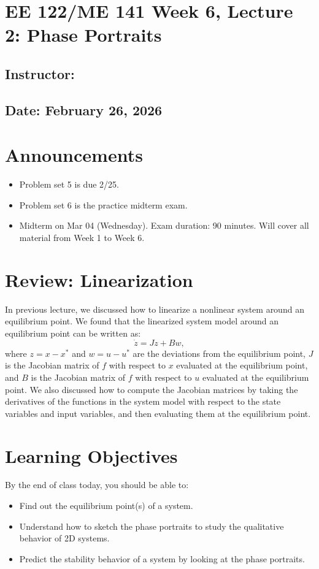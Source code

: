 \documentclass{ee122_notes}
\renewcommand{\releasedate}{February 26, 2026}
\begin{document}
\section*{EE 122/ME 141 Week 6, Lecture 2: Phase Portraits}
\subsection*{Instructor: \instructor}
\subsection*{Date: \releasedate}
\section{Announcements}
\begin{itemize}
    \item Problem set 5 is due 2/25.
    \item Problem set 6 is the practice midterm exam. 
    \item Midterm on Mar 04 (Wednesday). Exam duration: 90 minutes. Will cover all material from Week 1 to Week 6.
\end{itemize}

\section{Review: Linearization}
In previous lecture, we discussed how to linearize a nonlinear system around an equilibrium point. We found that the linearized system model around an equilibrium point can be written as:
\[
\dot z = J z + B w,
\]
where $z = x - x^*$ and $w = u - u^*$ are the deviations from the equilibrium point, $J$ is the Jacobian matrix of $f$ with respect to $x$ evaluated at the equilibrium point, and $B$ is the Jacobian matrix of $f$ with respect to $u$ evaluated at the equilibrium point. We also discussed how to compute the Jacobian matrices by taking the derivatives of the functions in the system model with respect to the state variables and input variables, and then evaluating them at the equilibrium point.

\section{Learning Objectives}
By the end of class today, you should be able to:
\begin{itemize}
    \item Find out the equilibrium point(s) of a system.
    \item Understand how to sketch the phase portraits to study the qualitative behavior of 2D systems.
    \item Predict the stability behavior of a system by looking at the phase portraits.
\end{itemize}
\end{document}
